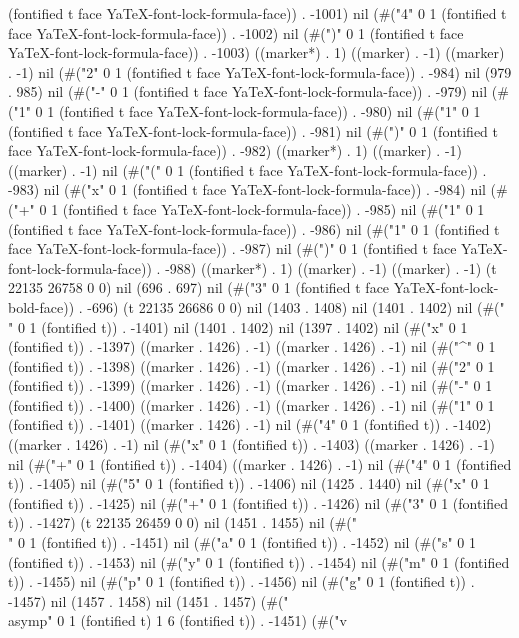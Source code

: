 (fontified t face YaTeX-font-lock-formula-face)) . -1001) nil (#("4" 0 1 (fontified t face YaTeX-font-lock-formula-face)) . -1002) nil (#(")" 0 1 (fontified t face YaTeX-font-lock-formula-face)) . -1003) ((marker*) . 1) ((marker) . -1) ((marker) . -1) nil (#("2" 0 1 (fontified t face YaTeX-font-lock-formula-face)) . -984) nil (979 . 985) nil (#("-" 0 1 (fontified t face YaTeX-font-lock-formula-face)) . -979) nil (#("1" 0 1 (fontified t face YaTeX-font-lock-formula-face)) . -980) nil (#("1" 0 1 (fontified t face YaTeX-font-lock-formula-face)) . -981) nil (#(")" 0 1 (fontified t face YaTeX-font-lock-formula-face)) . -982) ((marker*) . 1) ((marker) . -1) ((marker) . -1) nil (#("(" 0 1 (fontified t face YaTeX-font-lock-formula-face)) . -983) nil (#("x" 0 1 (fontified t face YaTeX-font-lock-formula-face)) . -984) nil (#("+" 0 1 (fontified t face YaTeX-font-lock-formula-face)) . -985) nil (#("1" 0 1 (fontified t face YaTeX-font-lock-formula-face)) . -986) nil (#("1" 0 1 (fontified t face YaTeX-font-lock-formula-face)) . -987) nil (#(")" 0 1 (fontified t face YaTeX-font-lock-formula-face)) . -988) ((marker*) . 1) ((marker) . -1) ((marker) . -1) (t 22135 26758 0 0) nil (696 . 697) nil (#("3" 0 1 (fontified t face YaTeX-font-lock-bold-face)) . -696) (t 22135 26686 0 0) nil (1403 . 1408) nil (1401 . 1402) nil (#(" " 0 1 (fontified t)) . -1401) nil (1401 . 1402) nil (1397 . 1402) nil (#("x" 0 1 (fontified t)) . -1397) ((marker . 1426) . -1) ((marker . 1426) . -1) nil (#("^" 0 1 (fontified t)) . -1398) ((marker . 1426) . -1) ((marker . 1426) . -1) nil (#("2" 0 1 (fontified t)) . -1399) ((marker . 1426) . -1) ((marker . 1426) . -1) nil (#("-" 0 1 (fontified t)) . -1400) ((marker . 1426) . -1) ((marker . 1426) . -1) nil (#("1" 0 1 (fontified t)) . -1401) ((marker . 1426) . -1) nil (#("4" 0 1 (fontified t)) . -1402) ((marker . 1426) . -1) nil (#("x" 0 1 (fontified t)) . -1403) ((marker . 1426) . -1) nil (#("+" 0 1 (fontified t)) . -1404) ((marker . 1426) . -1) nil (#("4" 0 1 (fontified t)) . -1405) nil (#("5" 0 1 (fontified t)) . -1406) nil (1425 . 1440) nil (#("x" 0 1 (fontified t)) . -1425) nil (#("+" 0 1 (fontified t)) . -1426) nil (#("3" 0 1 (fontified t)) . -1427) (t 22135 26459 0 0) nil (1451 . 1455) nil (#("\\" 0 1 (fontified t)) . -1451) nil (#("a" 0 1 (fontified t)) . -1452) nil (#("s" 0 1 (fontified t)) . -1453) nil (#("y" 0 1 (fontified t)) . -1454) nil (#("m" 0 1 (fontified t)) . -1455) nil (#("p" 0 1 (fontified t)) . -1456) nil (#("g" 0 1 (fontified t)) . -1457) nil (1457 . 1458) nil (1451 . 1457) (#("\\asymp" 0 1 (fontified t) 1 6 (fontified t)) . -1451) (#("v
